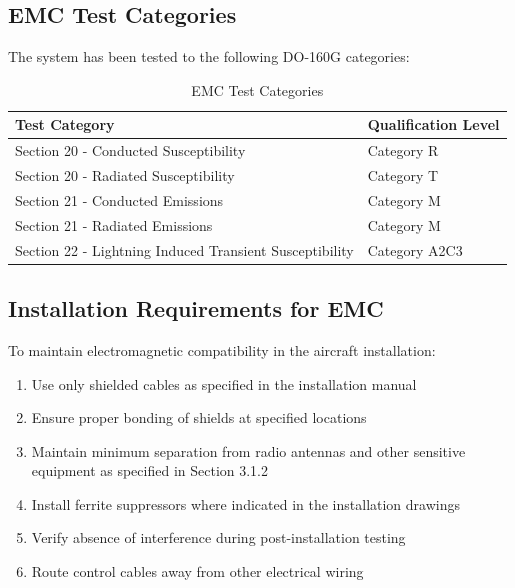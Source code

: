 \documentclass[12pt,a4paper,twoside,openright]{book}
\newcommand{\tabletextfont}{\normalfont\rmfamily}
\newcommand{\tableheadfont}{\normalfont\bfseries}
\begin{document}
\subsection{EMC Test Categories}

The system has been tested to the following DO-160G categories:

\begin{table}[h]
\centering
\setlength{\tabcolsep}{5pt} %
\begin{tabular}{|p{}|p{}|}
\hline
\tableheadfont\textbf{Test Category} & \tableheadfont\textbf{Qualification Level} \\
\hline
\tabletextfont Section 20 - Conducted Susceptibility & Category R \\
\hline
\tabletextfont Section 20 - Radiated Susceptibility & Category T \\
\hline
\tabletextfont Section 21 - Conducted Emissions & Category M \\
\hline
\tabletextfont Section 21 - Radiated Emissions & Category M \\
\hline
\tabletextfont Section 22 - Lightning Induced Transient Susceptibility & Category A2C3 \\
\hline
\end{tabular}
\caption{EMC Test Categories}
\end{table}

\subsection{Installation Requirements for EMC}

To maintain electromagnetic compatibility in the aircraft installation:

\begin{enumerate}
    \item Use only shielded cables as specified in the installation manual
    \item Ensure proper bonding of shields at specified locations
    \item Maintain minimum separation from radio antennas and other sensitive equipment as specified in Section 3.1.2
    \item Install ferrite suppressors where indicated in the installation drawings
    \item Verify absence of interference during post-installation testing
    \item Route control cables away from other electrical wiring
\end{enumerate}
\end{document}
